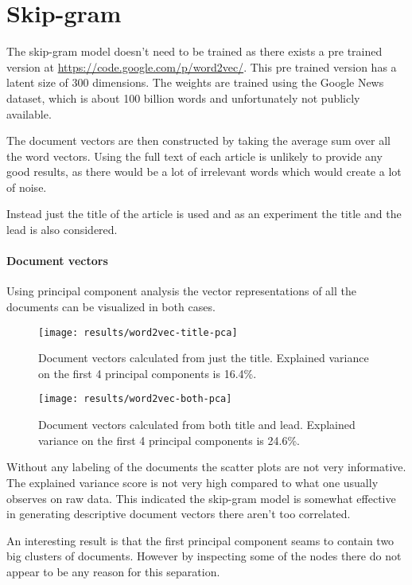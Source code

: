\section{Skip-gram}

The skip-gram model doesn't need to be trained as there exists a pre trained version at \url{https://code.google.com/p/word2vec/}. This pre trained version has a latent size of 300 dimensions. The weights are trained using the Google News dataset, which is about 100 billion words and unfortunately not publicly available.

The document vectors are then constructed by taking the average sum over all the word vectors. Using the full text of each article is unlikely to provide any good results, as there would be a lot of irrelevant words which would create a lot of noise. 

Instead just the title of the article is used and as an experiment the title and the lead is also considered.

\paragraph{Document vectors} Using principal component analysis the vector representations of all the documents can be visualized in both cases.
\begin{figure}[H]
	\centering
	\texttt{[image: results/word2vec-title-pca]}
	\caption{Document vectors calculated from just the title. Explained variance on the first 4 principal components is 16.4\%.}
\end{figure}

\begin{figure}[H]
	\centering
	\texttt{[image: results/word2vec-both-pca]}
	\caption{Document vectors calculated from both title and lead. Explained variance on the first 4 principal components is 24.6\%.}
\end{figure}

Without any labeling of the documents the scatter plots are not very informative. The explained variance score is not very high compared to what one usually observes on raw data. This indicated the skip-gram model is somewhat effective in generating descriptive document vectors there aren't too correlated.

An interesting result is that the first principal component seams to contain two big clusters of documents. However by inspecting some of the nodes there do not appear to be any reason for this separation.

